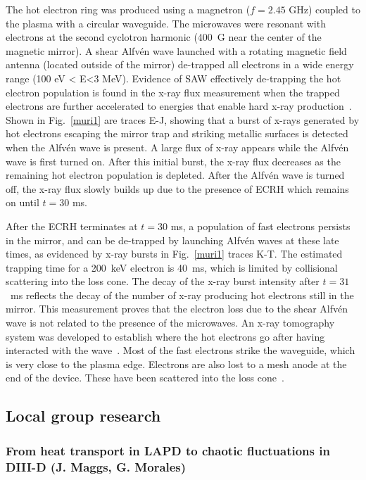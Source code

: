 \documentclass[11pt]{article}
\newcommand\Alfven{Alfv\'en }
\renewcommand{\cite}{\citep}
\begin{document}
The hot electron ring was produced using a magnetron ($f=2.45$ GHz)
coupled to the plasma with a circular waveguide. The microwaves were
resonant with electrons at the second cyclotron harmonic (400~G  near
the center of the magnetic mirror). A shear Alfv\'{e}n wave launched with a
rotating magnetic field antenna (located outside of the mirror)
de-trapped all electrons in a wide energy range (100 eV \textless{}
E\textless{}3 MeV). Evidence of SAW effectively de-trapping the hot
electron population is found in the x-ray flux measurement when the
trapped electrons are further accelerated to energies that enable hard
x-ray production~\cite{wang:2012}. Shown in Fig.~\ref{muri1} are
traces E-J, showing  that a burst of x-rays
generated by hot electrons escaping the mirror trap and striking
metallic surfaces  is detected when the \Alfven wave is present. A
large flux of x-ray appears while the Alfv\'{e}n wave is first turned on.
After this initial burst, the x-ray flux decreases as the remaining hot
electron population is depleted.
After the Alfv\'{e}n wave is turned off, the x-ray flux slowly builds up due
to the presence of ECRH which remains on until $t = 30$ ms.

After the ECRH terminates at $t = 30$ ms, a population of fast electrons
persists in the mirror, and can be de-trapped by launching Alfv\'{e}n waves
at these late times, as evidenced by x-ray bursts in Fig.~\ref{muri1} traces K-T.
The estimated trapping time for a 200~keV electron is 40~ms, which is
limited by collisional scattering into the loss cone. The
decay of the x-ray burst intensity after $t = 31$~ms reflects the decay of
the number of x-ray producing hot electrons still in the mirror. This
measurement proves that the electron loss due to the shear Alfv\'{e}n wave
is not related to the presence of the microwaves. An x-ray tomography
system was developed to establish where the hot electrons go after having
interacted with the wave~\cite{wang:2013}. Most of the fast electrons strike the
waveguide, which is very close to the plasma edge. Electrons are also
lost to a mesh anode at the end of the device. These have been scattered
into the loss cone~\cite{wang:2014}.




\subsection{Local group research}

\subsubsection{From heat transport in LAPD to chaotic fluctuations in DIII-D (J.
Maggs, G. Morales)}
\end{document}
